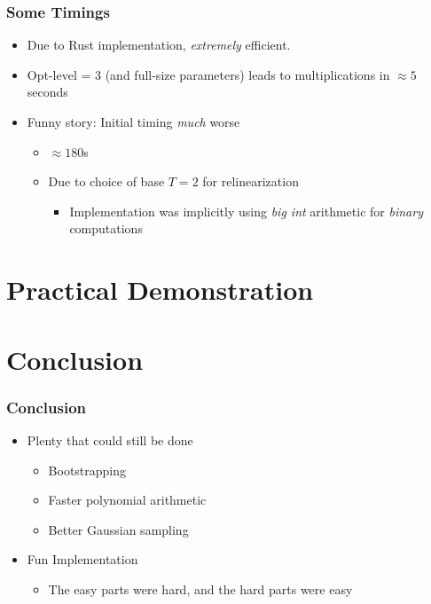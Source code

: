 \documentclass{beamer}
\theoremstyle{definition}
\begin{document}
\begin{frame}
	\frametitle{Some Timings}
	\begin{itemize}
		\item Due to Rust implementation, \emph{extremely} efficient.\pause{}
		\item Opt-level = 3 (and full-size parameters) leads to multiplications in $\approx 5$ seconds\pause{}
		\item Funny story: Initial timing \emph{much} worse\pause{}
		\begin{itemize}
			\item $\approx 180$s \pause{}
			\item Due to choice of base $T = 2$ for relinearization\pause{}
			\begin{itemize}
				\item Implementation was implicitly using \emph{big int} arithmetic for \emph{binary} computations\pause{}
			\end{itemize}
		\end{itemize}
	\end{itemize}
\end{frame}


\section{Practical Demonstration} 

\section{Conclusion}

\begin{frame}
	\frametitle{Conclusion}
	\begin{itemize}
		\item Plenty that could still be done\pause{}
\begin{itemize}
	\item Bootstrapping\pause{}
	\item Faster polynomial arithmetic\pause{}
	\item Better Gaussian sampling\pause{}
\end{itemize}
\item Fun Implementation\pause
\begin{itemize}
	\item The easy parts were hard, and the hard parts were easy
\end{itemize}
	\end{itemize}
\end{frame}
\end{document}
